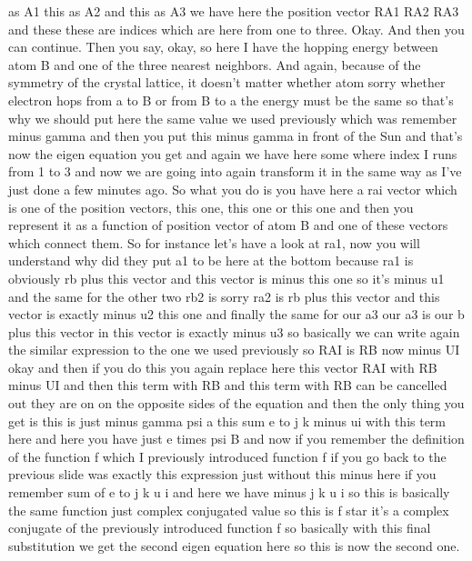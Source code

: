 as A1 this as A2 and this as A3 we have here the position vector RA1 RA2 RA3 and these these are indices which are here from one to three. Okay. And then you can continue. Then you say, okay, so here I have the hopping energy between atom B and one of the three nearest neighbors. And again, because of the symmetry of the crystal lattice, it doesn't matter whether atom sorry whether electron hops from a to B or from B to a the energy must be the same so that's why we should put here the same value we used previously which was remember minus gamma and then you put this minus gamma in front of the Sun and that's now the eigen equation you get and again we have here some where index I runs from 1 to 3 and now we are going into again transform it in the same way as I've just done a few minutes ago. So what you do is you have here a rai vector which is one of the position vectors, this one, this one or this one and then you represent it as a function of position vector of atom B and one of these vectors which connect them. So for instance let's have a look at ra1, now you will understand why did they put a1 to be here at the bottom because ra1 is obviously rb plus this vector and this vector is minus this one so it's minus u1 and the same for the other two rb2 is sorry ra2 is rb plus this vector and this vector is exactly minus u2 this one and finally the same for our a3 our a3 is our b plus this vector in this vector is exactly minus u3 so basically we can write again the similar expression to the one we used previously so RAI is RB now minus UI okay and then if you do this you again replace here this vector RAI with RB minus UI and then this term with RB and this term with RB can be cancelled out they are on on the opposite sides of the equation and then the only thing you get is this is just minus gamma psi a this sum e to j k minus ui with this term here and here you have just e times psi B and now if you remember the definition of the function f which I previously introduced function f if you go back to the previous slide was exactly this expression just without this minus here if you remember sum of e to j k u i and here we have minus j k u i so this is basically the same function just complex conjugated value so this is f star it's a complex conjugate of the previously introduced function f so basically with this final substitution we get the second eigen equation here so this is now the second one.

